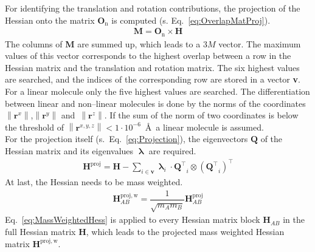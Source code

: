 	For identifying the translation and rotation contributions, the projection of the Hessian onto the matrix $\textbf{O}_\mathrm{n}$ is computed (s. Eq.~\eqref{eq:OverlapMatProj}).
	\begin{align}
		\label{eq:OverlapMatProj}
		\textbf{M} = \textbf{O}_\mathrm{n} \times \textbf{H}
	\end{align}
	The columns of \textbf{M} are summed up, which leads to a $3M$ vector.
	The maximum values of this vector corresponds to the highest overlap between a row in the Hessian matrix and the translation and rotation matrix.
	The six highest values are searched, and the indices of the corresponding row are stored in a vector \textbf{v}.
	For a linear molecule only the five highest values are searched.
	The differentiation between linear and non--linear molecules is done by
	the norms of the coordinates~$\left\| \textbf{r}^x \right\|$,$\left\| \textbf{r}^y \right\|$ and~$\left\| \textbf{r}^z \right\|$.
	If the sum of the norm of two coordinates is below the threshold of $ \left\| \textbf{r}^{x,y,z} \right\| < 1 \cdot 10^{-6}$~\AA ~a linear molecule is assumed.\\
	\newpage
	For the projection itself (s.~Eq.~\eqref{eq:Projection}), the eigenvectors $\textbf{Q}$ of the Hessian matrix  and its eigenvalues $\bm{\uplambda}$ are required.
	\begin{align}
		\label{eq:Projection}
		\textbf{H}^\mathrm{proj} =\textbf{H} - \sum_{i \in \textbf{v}} \bm{\uplambda}_i \cdot{\textbf{Q}^\intercal}_i \otimes \left({\textbf{Q}^\intercal}_i\right)^\intercal
	\end{align}
	At last, the Hessian needs to be mass weighted.
	\begin{align}
		\label{eq:MassWeightedHess}
		\textbf{H}_{AB}^\mathrm{proj,w} = \dfrac{1}{\sqrt{m_A m_B}} \textbf{H}_{AB}^\mathrm{proj}
	\end{align}
	Eq.~\eqref{eq:MassWeightedHess} is applied to every Hessian matrix block $\textbf{H}_{AB}$ in the full Hessian matrix $\textbf{H}$,
	which leads to the projected mass weighted Hessian matrix $\textbf{H}^\mathrm{proj,w}$.



